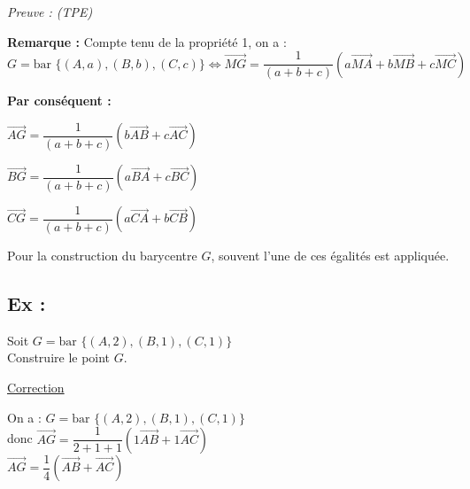 \documentclass{article}
\begin{document}
\noindent \textit{Preuve : (TPE)}

\vspace{1.5em}

\noindent \textbf{Remarque :} Compte tenu de la propriété 1, on a : \\
$G = \text{bar } \{(A, a), (B, b), (C, c)\} \iff \overrightarrow{MG} = \dfrac{1}{(a + b + c)} (a\overrightarrow{MA} + b\overrightarrow{MB} + c\overrightarrow{MC})$

\vspace{1.5em}

\noindent \textbf{Par conséquent :}

\vspace{1em}

\noindent $\overrightarrow{AG} = \dfrac{1}{(a + b + c)} (b\overrightarrow{AB} + c\overrightarrow{AC})$

\vspace{1.5em}

\noindent $\overrightarrow{BG} = \dfrac{1}{(a + b + c)} (a\overrightarrow{BA} + c\overrightarrow{BC})$

\vspace{1.5em}

\noindent $\overrightarrow{CG} = \dfrac{1}{(a + b + c)} (a\overrightarrow{CA} + b\overrightarrow{CB})$

\vspace{2em}

\noindent Pour la construction du barycentre $G$, souvent l'une de ces égalités est appliquée.

\subsection*{Ex :}

\noindent Soit $G = \text{bar } \{(A, 2), (B, 1), (C, 1)\}$ \\
Construire le point $G$.

\begin{center}
    \underline{Correction}
\end{center}

\noindent On a : $G = \text{bar } \{(A, 2), (B, 1), (C, 1)\}$ \\
donc $\overrightarrow{AG} = \dfrac{1}{2+1+1} (1 \overrightarrow{AB} + 1 \overrightarrow{AC})$ \\
\phantom{donc} $\overrightarrow{AG} = \dfrac{1}{4} (\overrightarrow{AB} + \overrightarrow{AC})$

\vspace{2em}
\end{document}
